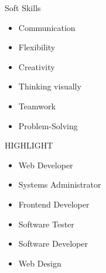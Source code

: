 \documentclass{resume} %
\begin{document}
\begin{rSection}{Soft Skills}
        \begin{multicols}{3}
        \begin{itemize}[noitemsep,topsep=-6pt]
            \item Communication
            \item Flexibility
        \end{itemize}
        \columnbreak
        \begin{itemize}[noitemsep,topsep=-6pt]
            \item Creativity
            \item Thinking visually
        \end{itemize}

        \columnbreak
        
        \begin{itemize}[noitemsep,topsep=-6pt]
            \item Teamwork
            \item Problem-Solving 
        \end{itemize}
        \end{multicols}
\end{rSection}

\begin{rSection}{HIGHLIGHT}
        \begin{multicols}{3}
        \begin{itemize}[noitemsep,topsep=-6pt]
            \item Web Developer
            \item Systems Administrator
        \end{itemize}
        \columnbreak
        \begin{itemize}[noitemsep,topsep=-6pt]
            \item Frontend Developer
            \item Software Tester
        \end{itemize}

        \columnbreak
        
        \begin{itemize}[noitemsep,topsep=-6pt]
            \item Software Developer
            \item Web Design
        \end{itemize}
        \end{multicols}
\end{rSection}
\end{document}
